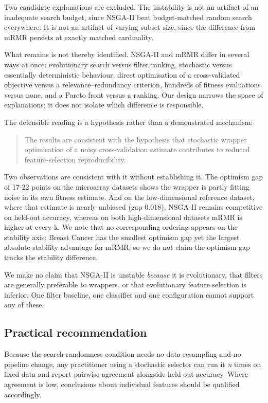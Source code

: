\documentclass[conference]{IEEEtran}
\begin{document}
Two candidate explanations are excluded. The instability is not an artifact of an inadequate search budget, since NSGA-II beat budget-matched random search everywhere. It is not an artifact of varying subset size, since the difference from mRMR persists at exactly matched cardinality.

What remains is not thereby identified. NSGA-II and mRMR differ in several ways at once: evolutionary search versus filter ranking, stochastic versus essentially deterministic behaviour, direct optimisation of a cross-validated objective versus a relevance--redundancy criterion, hundreds of fitness evaluations versus none, and a Pareto front versus a ranking. Our design narrows the space of explanations; it does not isolate which difference is responsible.

The defensible reading is a hypothesis rather than a demonstrated mechanism:

\begin{quote}
The results are consistent with the hypothesis that stochastic wrapper optimisation of a noisy cross-validation estimate contributes to reduced feature-selection reproducibility.
\end{quote}

Two observations are consistent with it without establishing it. The optimism gap of 17-22 points on the microarray datasets shows the wrapper is partly fitting noise in its own fitness estimate. And on the low-dimensional reference dataset, where that estimate is nearly unbiased (gap 0.018), NSGA-II remains competitive on held-out accuracy, whereas on both high-dimensional datasets mRMR is higher at every k. We note that no corresponding ordering appears on the stability axis: Breast Cancer has the smallest optimism gap yet the largest absolute stability advantage for mRMR, so we do not claim the optimism gap tracks the stability difference.

We make no claim that NSGA-II is unstable \emph{because} it is evolutionary, that filters are generally preferable to wrappers, or that evolutionary feature selection is inferior. One filter baseline, one classifier and one configuration cannot support any of these.

\subsection{Practical recommendation}

Because the search-randomness condition needs no data resampling and no pipeline change, any practitioner using a stochastic selector can run it \emph{n} times on fixed data and report pairwise agreement alongside held-out accuracy. Where agreement is low, conclusions about individual features should be qualified accordingly.
\end{document}

